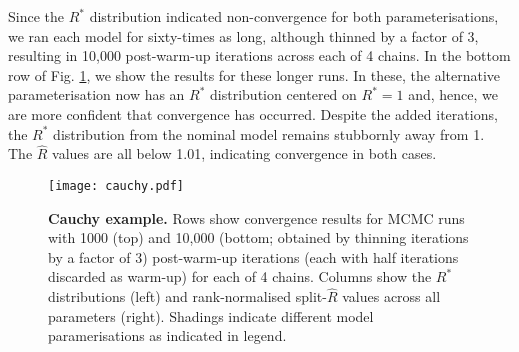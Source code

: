 \documentclass{article}
\begin{document}
Since the $R^*$ distribution indicated non-convergence for both parameterisations, we ran each model for sixty-times as long, although thinned by a factor of 3, resulting in 10,000 post-warm-up iterations across each of 4 chains. In the bottom row of Fig. \ref{fig:cauchy}, we show the results for these longer runs. In these, the alternative parameterisation now has an $R^*$ distribution centered on $R^*=1$ and, hence, we are more confident that convergence has occurred. Despite the added iterations, the $R^*$ distribution from the nominal model remains stubbornly away from 1. The $\widehat{R}$ values are all below 1.01, indicating convergence in both cases.

\begin{figure}[!htb]
	\centerline{\texttt{[image: cauchy.pdf]}}
	\caption{\textbf{Cauchy example.} Rows show convergence results for MCMC runs with 1000 (top) and 10,000 (bottom; obtained by thinning iterations by a factor of 3) post-warm-up iterations (each with half iterations discarded as warm-up) for each of 4 chains. Columns show the $R^*$ distributions (left) and rank-normalised split-$\widehat{R}$ values across all parameters (right). Shadings indicate different model paramerisations as indicated in legend.}
	\label{fig:cauchy}
\end{figure}
\end{document}
